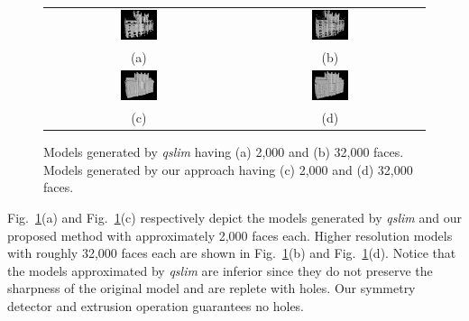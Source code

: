\documentclass[review]{acmsiggraph}       %
\newcommand{\Figa}[1]{Fig.~\ref{fig:#1}(a)}
\newcommand{\Figb}[1]{Fig.~\ref{fig:#1}(b)}
\newcommand{\Figc}[1]{Fig.~\ref{fig:#1}(c)}
\newcommand{\Figd}[1]{Fig.~\ref{fig:#1}(d)}
\begin{document}
\begin{figure}[htbp]
\begin{center}
\begin{tabular}{cc}
\includegraphics[width=0.2\textwidth]{comp_32_2_qslim.png} &
\includegraphics[width=0.2\textwidth]{comp_4_2_qslim.png} \\
(a) & (b) \\
\includegraphics[width=0.2\textwidth]{comp_32_2.png} &
\includegraphics[width=0.2\textwidth]{comp_4_2.png} \\
(c) & (d)
\end{tabular}
\end{center}
\caption{
Models generated by {\it qslim} having (a) 2,000 and (b) 32,000 faces.
Models generated by our approach having (c) 2,000 and (d) 32,000 faces.}
\label{fig:TH_comp}
\end{figure}

\Figa{TH_comp} and \Figc{TH_comp} respectively depict the models generated
by {\it qslim} and our proposed method with approximately 2,000 faces each.
Higher resolution models with roughly 32,000 faces each are shown in
\Figb{TH_comp} and \Figd{TH_comp}.
Notice that the models approximated by {\it qslim} are inferior since they
do not preserve the sharpness of the original model and are replete with
holes. Our symmetry detector and extrusion operation guarantees no holes.

\end{document}
